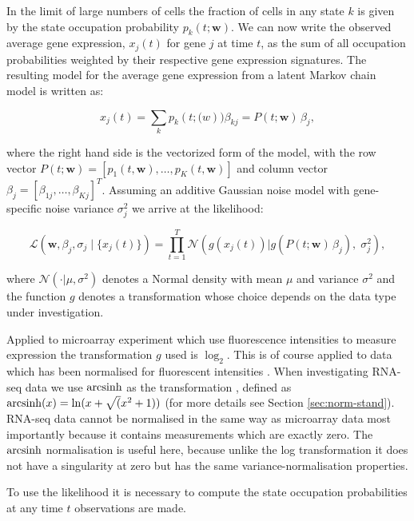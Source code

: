 In the limit of large numbers of cells the fraction of cells in any state $k$ is given by the state occupation probability $p_k(t;\mathbf{w})$. We can now write the observed average gene expression, $x_j(t)$ for gene $j$ at time $t$, as the sum of all occupation probabilities weighted by their respective gene expression signatures. The resulting model for the average gene expression from a latent Markov chain model is written as:

\begin{equation}
  x_j(t) = \sum_k p_k(t;\mathbf(w))\beta_{kj} = P(t;\mathbf{w}) \, \beta_j,
  \label{eq:model}
\end{equation}

where the right hand side is the vectorized form of the model, with the row vector $P(t;\mathbf{w}) = [p_1(t,\mathbf{w}), \ldots , p_K(t,\mathbf{w})]$ and column vector $\beta_j = [\beta_{1j}, \ldots , \beta_{Kj}]^T$. Assuming an additive Gaussian noise model with gene-specific noise variance $\sigma_j^2 $ we arrive at the likelihood:

\begin{equation}
  \label{eq:likelihood}
    \mathcal{L} \left(\mathbf{w}, \beta_j, \sigma_j \;|\; \lbrace x_j(t)\rbrace\right) = 
\prod_{t=1}^T \mathcal{N}\left(g(x_j(t)) | g\left(P(t; \mathbf{w})\,\beta_j\right),\; \sigma_j^2 \right),
\end{equation}

where $\mathcal{N}(\cdot | \mu,\sigma^2)$ denotes a Normal density with mean $\mu$ and variance $\sigma^2$ and the function $g$ denotes a transformation whose choice depends on the data type under investigation.

Applied to microarray experiment which use fluorescence intensities to measure expression the transformation $g$ used is $\log_2$. This is of course applied to data which has been normalised for fluorescent intensities \cite{Dudoit:2002va}. When investigating RNA-seq data we use $\operatorname{arcsinh}$ as the transformation \citep{Hoffman:2012gn,Johnson:1949uq}, defined as $\operatorname{arcsinh}(x) = \ln(x + \sqrt(x^2 +1))$ (for more details see Section \ref{sec:norm-stand}). RNA-seq data cannot be normalised in the same way as microarray data most importantly because it contains measurements which are exactly zero. The $\operatorname{arcsinh}$ normalisation is useful here, because unlike the log transformation it does not have a singularity at zero but has the same variance-normalisation properties.

To use the likelihood it is necessary to compute the state occupation probabilities at any time $t$ observations are made.

